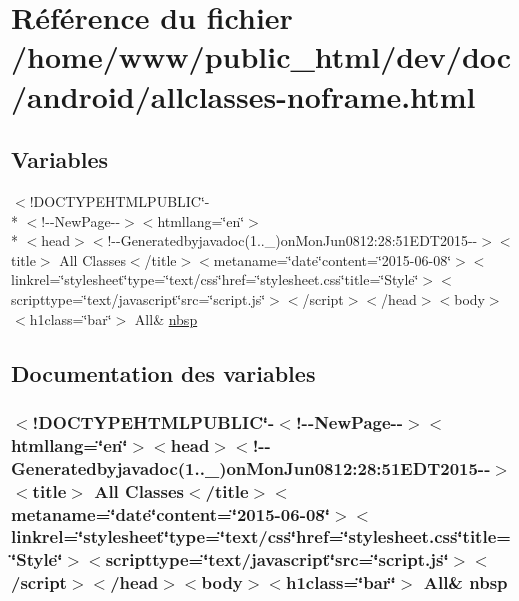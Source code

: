\hypertarget{allclasses-noframe_8html}{\section{Référence du fichier /home/www/public\-\_\-html/dev/doc/android/allclasses-\/noframe.html}
\label{allclasses-noframe_8html}
}
\subsection*{Variables}
\begin{DoxyCompactItemize}
\item 
$<$!D\-O\-C\-T\-Y\-P\-E\-H\-T\-M\-L\-P\-U\-B\-L\-I\-C\char`\"{}-\/\\*
$<$!-\/-\/New\-Page-\/-\/$>$$<$htmllang=\char`\"{}en\char`\"{}$>$\\*
$<$head$>$$<$!-\/-\/Generatedbyjavadoc(1..\-\_)on\-Mon\-Jun0812\-:28\-:51\-E\-D\-T2015-\/-\/$>$$<$title$>$ All Classes$<$/title$>$$<$metaname=\char`\"{}date\char`\"{}content=\char`\"{}2015-\/06-\/08\char`\"{}$>$$<$linkrel=\char`\"{}stylesheet\char`\"{}type=\char`\"{}text/css\char`\"{}href=\char`\"{}stylesheet.\-css\char`\"{}title=\char`\"{}\-Style\char`\"{}$>$$<$scripttype=\char`\"{}text/javascript\char`\"{}src=\char`\"{}script.\-js\char`\"{}$>$$<$/script$>$$<$/head$>$$<$body$>$$<$h1class=\char`\"{}bar\char`\"{}$>$ All\& \hyperlink{allclasses-noframe_8html_a09776f3f83bcfa629ad30ffd4e0056c3}{nbsp}
\end{DoxyCompactItemize}


\subsection{Documentation des variables}
\hypertarget{allclasses-noframe_8html_a09776f3f83bcfa629ad30ffd4e0056c3}{
\subsubsection[{nbsp}]{\setlength{\rightskip}{0pt plus 5cm}$<$!D\-O\-C\-T\-Y\-P\-E\-H\-T\-M\-L\-P\-U\-B\-L\-I\-C\char`\"{}-\/$<$!-\/-\/New\-Page-\/-\/$>$$<$htmllang=\char`\"{}en\char`\"{}$>$$<$head$>$$<$!-\/-\/Generatedbyjavadoc(1..\-\_)on\-Mon\-Jun0812\-:28\-:51\-E\-D\-T2015-\/-\/$>$$<$title$>$ All Classes$<$/title$>$$<$metaname=\char`\"{}date\char`\"{}content=\char`\"{}2015-\/06-\/08\char`\"{}$>$$<$linkrel=\char`\"{}stylesheet\char`\"{}type=\char`\"{}text/css\char`\"{}href=\char`\"{}stylesheet.\-css\char`\"{}title=\char`\"{}\-Style\char`\"{}$>$$<$scripttype=\char`\"{}text/javascript\char`\"{}src=\char`\"{}script.\-js\char`\"{}$>$$<$/script$>$$<$/head$>$$<$body$>$$<$h1class=\char`\"{}bar\char`\"{}$>$ All\& nbsp}}\label{allclasses-noframe_8html_a09776f3f83bcfa629ad30ffd4e0056c3}
